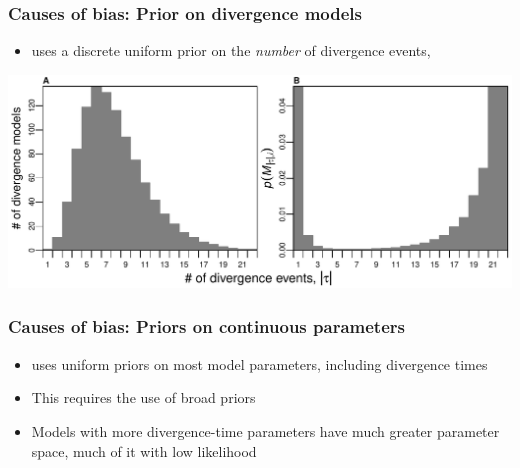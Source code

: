 \begin{frame}
    \frametitle{Causes of bias: Prior on divergence models}
    \begin{itemize}
        \item \msb uses a discrete uniform prior on the \emph{number} of
            divergence events, \divTimeNum
    \end{itemize}
    \centerline{
    \includegraphics[width=\textwidth]{images/partition_numbers.pdf}}
\end{frame}

\begin{frame}
    \frametitle{Causes of bias: Priors on continuous parameters}
    \begin{itemize}
        \item<1-> \msb uses uniform priors on most model parameters, including
            divergence times
        \item<2-> This requires the use of broad priors
        \item<3-> Models with more divergence-time parameters have much greater
            parameter space, much of it with low likelihood
    \end{itemize}
\end{frame}

